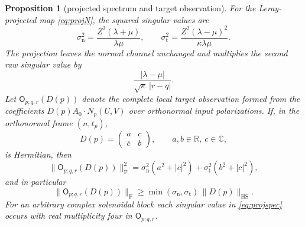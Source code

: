 \documentclass[11pt]{article}
\newtheorem{proposition}[theorem]{Proposition}
\theoremstyle{definition}
\theoremstyle{remark}
\theoremstyle{plain}
\newcommand{\R}{\mathbb{R}}
\newcommand{\C}{\mathbb{C}}
\begin{document}
\begin{proposition}[projected spectrum and target observation]
\label{prop:projected}
For the Leray-projected map \eqref{eq:projN}, the squared singular values are
\begin{equation}
\label{eq:projspec}
\sigma_{\mathrm n}^{2}
=\frac{Z^{2}(\lambda+\mu)}{\lambda\mu},
\qquad
\sigma_{\mathrm t}^{2}
=\frac{Z^{2}(\lambda-\mu)^{2}}{\kappa\lambda\mu} .
\end{equation}
The projection leaves the normal channel unchanged and multiplies the second
raw singular value by
\begin{equation}
\label{eq:defectfactor}
\frac{|\lambda-\mu|}{\sqrt\kappa\,|r-q|} .
\end{equation}
Let $\mathsf O_{p;q,r}(D(p))$ denote the complete local target observation
formed from the coefficients $D(p)A_{0}\cdot N_{p}(U,V)$ over orthonormal input
polarizations. If, in the orthonormal frame $(n,t_{p})$,
\[
D(p)=\begin{pmatrix}a&c\\ \overline c&b\end{pmatrix},
\qquad a,b\in\R,\ c\in\C,
\]
is Hermitian, then
\begin{equation}
\label{eq:obsnorm}
\|\mathsf O_{p;q,r}(D(p))\|_{\mathrm F}^{2}
=\sigma_{\mathrm n}^{2}(a^{2}+|c|^{2})
+\sigma_{\mathrm t}^{2}(b^{2}+|c|^{2}),
\end{equation}
and in particular
\begin{equation}
\label{eq:obsbound}
\|\mathsf O_{p;q,r}(D(p))\|_{\mathrm F}
\ge\min(\sigma_{\mathrm n},\sigma_{\mathrm t})\,\|D(p)\|_{\mathrm{HS}} .
\end{equation}
For an arbitrary complex solenoidal block each singular value in
\eqref{eq:projspec} occurs with real multiplicity four in
$\mathsf O_{p;q,r}$.
\end{proposition}
\end{document}
